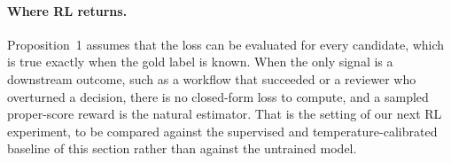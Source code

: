 \paragraph{Where RL returns.}
Proposition~1 assumes that the loss can be evaluated for every candidate, which is true
exactly when the gold label is known. When the only signal is a downstream outcome, such as a
workflow that succeeded or a reviewer who overturned a decision, there is no closed-form loss to
compute, and a sampled proper-score reward is the natural estimator. That is the setting of our
next RL experiment, to be compared against the supervised and temperature-calibrated
baseline of this section rather than against the untrained model.
